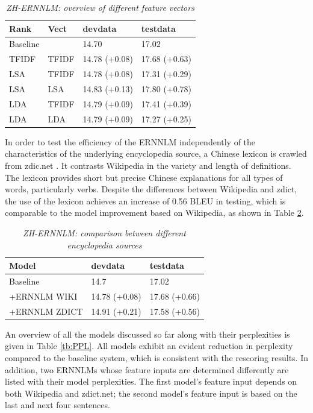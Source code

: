 \documentclass[a4paper]{article}
\begin{document}
\begin{table}
\caption{\it ZH-ERNNLM: overview of different feature vectors}
\vspace{2mm}
\centering
  \begin{tabular}{llll}
  	\hline
  	Rank     & Vect  & devdata       & testdata      \\ \hline\hline
  	Baseline &       & 14.70         & 17.02         \\ \hline
  	TFIDF    & TFIDF & 14.78 (+0.08) & 17.68 (+0.63) \\
  	LSA      & TFIDF & 14.78 (+0.08) & 17.31 (+0.29) \\
  	LSA      & LSA   & 14.83 (+0.13) & 17.80 (+0.78) \\
  	LDA      & TFIDF & 14.79 (+0.09) & 17.41 (+0.39) \\
  	LDA      & LDA   & 14.79 (+0.09) & 17.27 (+0.25)
  \end{tabular}
  \label{tb:zh-extended-diff-features}
\end{table}

In order to test the efficiency of the ERNNLM independently of the characteristics of the underlying encyclopedia  source, a Chinese lexicon is crawled from zdic.net \cite{zdic}. It contrasts Wikipedia in the variety and length of definitions. The lexicon provides short but precise Chinese explanations for all types of words, particularly verbs. Despite the differences between Wikipedia and zdict, the use of the lexicon achieves an increase of 0.56 BLEU in testing, which is comparable to the
model improvement based on Wikipedia, as shown in Table \ref{tb:zh-extended-diff-sources}.

\begin{table}
\caption{\it ZH-ERNNLM: comparison between different encyclopedia sources}
\vspace{2mm}
\centering
  \begin{tabular}{lll}
  	\hline
  	Model         & devdata       & testdata      \\ \hline\hline
  	Baseline      & 14.7          & 17.02         \\ \hline
  	+ERNNLM WIKI  & 14.78 (+0.08) & 17.68 (+0.66) \\
  	+ERNNLM ZDICT & 14.91 (+0.21) & 17.58 (+0.56) \\ \hline
  \end{tabular}
  \label{tb:zh-extended-diff-sources}
\end{table}

An overview of all the models discussed so far along with their perplexities is given in Table \ref{tb:PPL}. All models exhibit an evident reduction in perplexity compared to the baseline system, which is consistent with the rescoring results. In addition, two ERNNLMs whose feature inputs are determined differently are listed with their model perplexities. The first model's feature input depends on both Wikipedia and zdict.net; the second model's feature input is based on the last and next four sentences.
\end{document}
